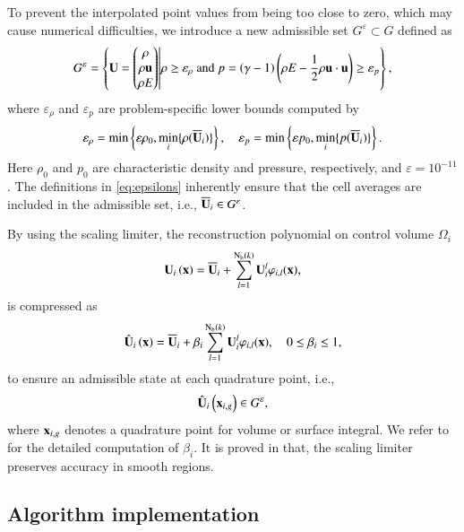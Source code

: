 To prevent the interpolated point values from being too close to zero, which may cause numerical difficulties, we introduce a new admissible set $G^\varepsilon \subset G$ defined as
\begin{equation}
    G^\varepsilon= \left\{
    \mathbf{U} =  \begin{pmatrix}
        \rho \\ \rho \mathbf{u} \\ \rho E
    \end{pmatrix} \middle|
    \rho  \geq \varepsilon_\rho
    \text{ and }
    p=\left(\gamma-1\right) \left(\rho E - \dfrac{1}{2} \rho \mathbf{u} \cdot \mathbf{u}\right) \geq \varepsilon_p
    \right\},
\end{equation}
where $\varepsilon_\rho$ and $\varepsilon_p$ are problem-specific lower bounds computed by
\begin{equation}\label{eq:epsilons}
    \varepsilon_\rho=\min\left\{\varepsilon \rho_0, \min_i\{\rho(\overline{\mathbf{U}}_i)\}\right\}, \quad 
    \varepsilon_p=\min\left\{\varepsilon p_0, \min_i\{p(\overline{\mathbf{U}}_i)\}\right\}.
\end{equation}
Here $\rho_0$ and $p_0$ are characteristic density and pressure, respectively, and $\varepsilon=10^{-11}$. The definitions in \eqref{eq:epsilons} inherently ensure that the cell averages are included in the admissible set, i.e., $\overline{\mathbf{U}}_i \in G^\varepsilon$.

By using the scaling limiter, the reconstruction polynomial on control volume $\Omega_i$
\begin{equation}
    \mathbf{U}_{i} \left(\mathbf{x}\right) = \overline{\mathbf{U}}_{i} + \sum_{l=1}^{\mathrm{N_b}(k)}{\mathbf{U}_i^l\varphi_{i,l}(\mathbf{x})},
\end{equation}
is compressed as
\begin{equation}
\label{eq:polynomial-scaling}
    \hat{\mathbf{U}}_{i} \left(\mathbf{x}\right) = \overline{\mathbf{U}}_{i} + \beta_i \sum_{l=1}^{\mathrm{N_b}(k)}{\mathbf{U}_i^l\varphi_{i,l}(\mathbf{x})}, \quad 0 \leq \beta_i \leq 1,
\end{equation}
to ensure an admissible state at each quadrature point, i.e.,
\begin{equation}
    \hat{\mathbf{U}}_{i} \left(\mathbf{x}_{i,g}\right) \in G^{\varepsilon},
\end{equation}
where $\mathbf{x}_{i,g}$ denotes a quadrature point for volume or surface integral. We refer to \cite{zhang2010positivity} for the detailed computation of $\beta_i$. 
It is proved in \cite{zhang2010positivity} that, the scaling limiter preserves accuracy in smooth regions.

\subsection{Algorithm implementation}

